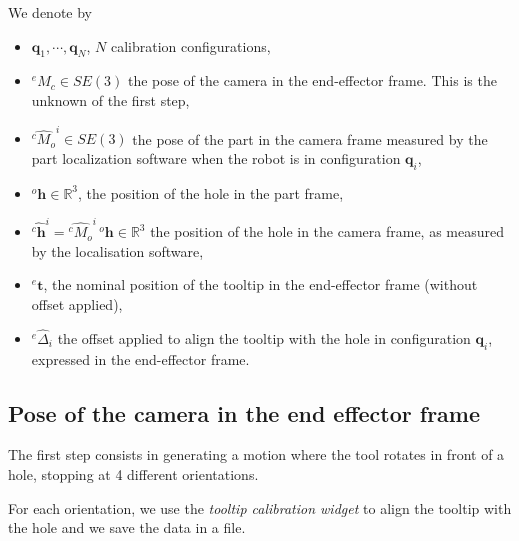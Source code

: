 \documentclass {article}
\newcommand\conf{\mathbf{q}}
\newcommand\transf[2]{^{#1}M_{#2}}
\newcommand\hole{\mathbf{h}}
\newcommand\tool{\mathbf{t}}
\newcommand{\reals}{\mathbb{R}}
\begin{document}
We denote by
\begin{itemize}
\item $\conf_1,\cdots,\conf_N$, $N$ calibration configurations,
\item $\transf{e}{c}\in SE(3)$ the pose of the camera in the end-effector frame. This
  is the unknown of the first step,
\item $\hat{\transf{c}{o}}^i\in SE(3)$ the pose of the part in the camera frame measured by the part localization software when the robot is in configuration $\conf_i$,
\item $^{o}\hole\in\reals^3$, the position of the hole in the part frame,
\item $\hat{^{c}\hole}^i = \hat{\transf{c}{o}}^i\, ^{o}\hole\in\reals^3$ the position of the hole in the camera frame, as measured by the localisation software,
\item $^{e}\tool$, the nominal position of the tooltip in the end-effector frame (without offset applied),
\item $^{e}\hat{\Delta}_i$ the offset applied to align the tooltip with the hole in configuration $\conf_i$, expressed in the end-effector frame.
\end{itemize}

\subsection{Pose of the camera in the end effector frame}

The first step consists in generating a motion where the tool rotates in front
of a hole, stopping at 4 different orientations.

For each orientation, we use the \textit{tooltip calibration widget} to align
the tooltip with the hole and we save the data in a file.
\end{document}
